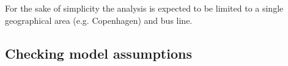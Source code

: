 \documentclass[a4paper,11pt]{article}
\begin{document}
For the sake of simplicity the analysis is expected to be limited to a single geographical area (e.g. Copenhagen) and bus line.

\subsection{Checking model assumptions}

\begin{spacing}{1}
  
  
\end{spacing}
\end{document}
